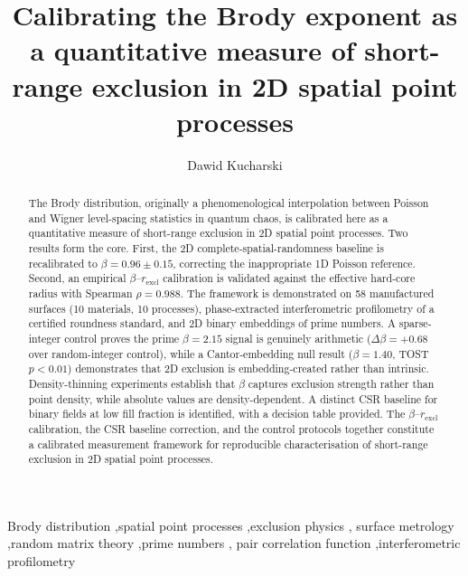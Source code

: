 \documentclass[final,3p,times,twocolumn]{elsarticle}
\theoremstyle{definition}
\begin{document}
\begin{frontmatter}

\title{Calibrating the Brody exponent as a quantitative measure
of short-range exclusion in 2D spatial point processes}

\author[put]{Dawid Kucharski}

\begin{abstract}
The Brody distribution, originally a phenomenological interpolation
between Poisson and Wigner level-spacing statistics in quantum chaos,
is calibrated here as a quantitative measure of short-range exclusion
in 2D spatial point processes. Two results form the core. First, the
2D complete-spatial-randomness baseline is recalibrated to
$\beta=0.96\pm0.15$, correcting the inappropriate 1D Poisson reference.
Second, an empirical $\beta$--$r_{\text{excl}}$ calibration is
validated against the effective hard-core radius with Spearman
$\rho=0.988$. The framework is demonstrated on 58 manufactured
surfaces (10 materials, 10 processes), phase-extracted
interferometric profilometry of a certified roundness standard,
and 2D binary embeddings of prime numbers. A sparse-integer control
proves the prime $\beta=2.15$ signal is genuinely arithmetic
($\Delta\beta=+0.68$ over random-integer control), while a
Cantor-embedding null result ($\beta=1.40$, TOST $p<0.01$)
demonstrates that 2D exclusion is embedding-created rather than
intrinsic. Density-thinning experiments establish that $\beta$
captures exclusion strength rather than point density, while absolute
values are density-dependent. A distinct CSR baseline for binary
fields at low fill fraction is identified, with a decision table
provided. The $\beta$--$r_{\text{excl}}$ calibration, the CSR
baseline correction, and the control protocols together constitute
a calibrated measurement framework for reproducible characterisation
of short-range exclusion in 2D spatial point processes.
\end{abstract}

\begin{keyword}
Brody distribution \sep spatial point processes \sep exclusion physics \sep
surface metrology \sep random matrix theory \sep prime numbers \sep
pair correlation function \sep interferometric profilometry
\end{keyword}

\end{frontmatter}
\end{document}
